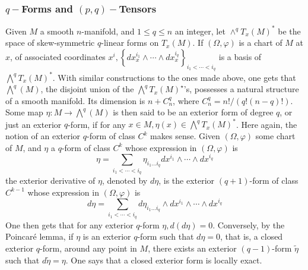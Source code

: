 \documentclass[12pt,hyperref,a4paper,UTF8]{ctexart}
\begin{document}
\subsubsection{$q-$Forms and $(p,q)-$Tensors}
Given $M$ a smooth $n$-manifold, and $1 \leq q \leq n$ an integer, let $\wedge^q T_x(M)^*$ be the space of skew-symmetric $q$-linear forms on $T_x(M)$. If $(\Omega, \varphi)$ is a chart of $M$ at $x$, of associated coordinates $x^i,\left\{d x_x^{i_1} \wedge \cdots \wedge d x_x^{i_q}\right\}_{i_1<\cdots<i_q}$ is a basis of $\bigwedge^q T_x(M)^*$. With similar constructions to the ones made above, one gets that $\bigwedge^q(M)$, the disjoint union of the $\bigwedge^q T_x(M)^{\star}$'s, possesses a natural structure of a smooth manifold. Its dimension is $n+C_n^q$, where $C_n^q=n!/(q!(n-q)!)$. Some map $\eta: M \rightarrow \bigwedge^q(M)$ is then said to be an exterior form of degree $q$, or just an exterior $q$-form, if for any $x \in M, \eta(x) \in \bigwedge^q T_x(M)^*$. Here again, the notion of an exterior $q$-form of class $C^k$ makes sense. Given $(\Omega, \varphi)$ some chart of $M$, and $\eta$ a $q$-form of class $C^k$ whose expression in $(\Omega, \varphi)$ is
$$
\eta=\sum_{i_1<\cdots<i_q} \eta_{i_1 \ldots i_q} d x^{i_1} \wedge \cdots \wedge d x^{i_q}
$$
the exterior derivative of $\eta$, denoted by $d \eta$, is the exterior $(q+1)$-form of class $C^{k-1}$ whose expression in $(\Omega, \varphi)$ is
$$
d \eta=\sum_{i_1<\cdots<i_q} d \eta_{i_1 \ldots i_q} \wedge d x^{i_1} \wedge \cdots \wedge d x^{i_q}
$$
One then gets that for any exterior $q$-form $\eta, d(d \eta)=0$. Conversely, by the Poincaré lemma, if $\eta$ is an exterior $q$-form such that $d \eta=0$, that is, a closed exterior $q$-form, around any point in $M$, there exists an exterior $(q-1)$-form $\tilde{\eta}$ such that $d \tilde{\eta}=\eta$. One says that a closed exterior form is locally exact.
\end{document}
